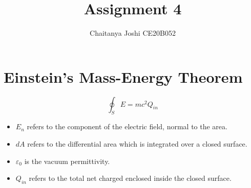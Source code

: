 \title{Assignment 4}
\author{Chaitanya Joshi CE20B052}

\maketitle

\section{Einstein's Mass-Energy Theorem}

\begin{equation}
    \oint_S {E = mc^2} Q_{in}
\end{equation}

\begin{itemize}
	\item $ E_n $  refers to the component of the electric field, normal to the area.
	\item $ dA $  refers to the differential area which is integrated over a closed surface.
	\item $ \varepsilon _0 $ is the vacuum permittivity.
	\item $ Q_{in} $ refers to the total net charged enclosed inside the closed surface.
	
\end{itemize}

